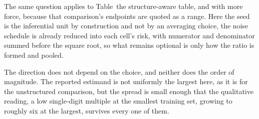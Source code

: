 The same question applies to Table~the structure-aware table, and with more force,
because that comparison's endpoints are quoted as a range. Here the seed is the
inferential unit by construction and not by an averaging choice, the
noise schedule is already reduced into each cell's risk, with numerator and
denominator summed before the square root, so what remains optional is only
how the ratio is formed and pooled.



\noindent The direction does not depend on the choice, and neither does the
order of magnitude. The reported estimand is not uniformly the largest here, as
it is for the unstructured comparison, but the spread is small enough that the
qualitative reading, a low single-digit multiple at the smallest training set,
growing to roughly six at the largest, survives every one of them.
